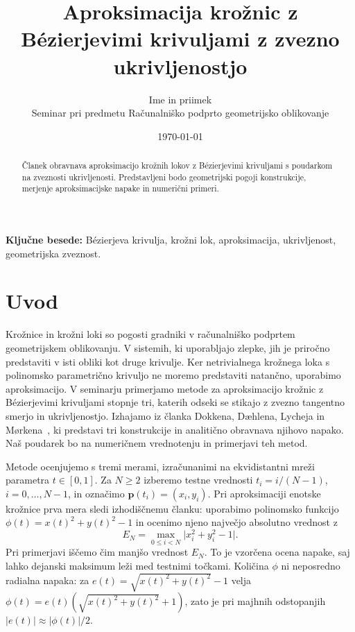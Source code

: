 \documentclass[a4paper,11pt]{article}
\title{Aproksimacija krožnic z Bézierjevimi krivuljami\break
       z zvezno ukrivljenostjo}
\author{Ime in priimek\\
  \small Seminar pri predmetu Računalniško podprto geometrijsko oblikovanje}
\date{\today}
\theoremstyle{definition}
\theoremstyle{remark}
\begin{document}
\maketitle

\begin{abstract}
Članek obravnava aproksimacijo krožnih lokov z Bézierjevimi krivuljami
s poudarkom na zveznosti ukrivljenosti. Predstavljeni bodo geometrijski
pogoji konstrukcije, merjenje aproksimacijske napake in numerični primeri.
\end{abstract}

\noindent\textbf{Ključne besede:} Bézierjeva krivulja, krožni lok,
aproksimacija, ukrivljenost, geometrijska zveznost.

\section{Uvod}
\label{sec:uvod}
Krožnice in krožni loki so pogosti gradniki v računalniško podprtem
geometrijskem oblikovanju. V sistemih, ki uporabljajo zlepke, jih je
priročno predstaviti v isti obliki kot druge krivulje. Ker netrivialnega
krožnega loka s polinomsko parametrično krivuljo ne moremo predstaviti
natančno, uporabimo aproksimacijo. V seminarju primerjamo metode za
aproksimacijo krožnic z Bézierjevimi krivuljami stopnje tri, katerih
odseki se stikajo z zvezno tangentno smerjo in ukrivljenostjo. Izhajamo
iz članka Dokkena, Dæhlena, Lycheja in Mørkena~\cite{dokken1990},
ki predstavi tri konstrukcije in analitično obravnava njihovo napako.
Naš poudarek bo na numeričnem vrednotenju in primerjavi teh metod.

Metode ocenjujemo s tremi merami, izračunanimi na ekvidistantni mreži
parametra $t\in[0,1]$. Za $N\geq 2$ izberemo testne vrednosti
$t_i=i/(N-1)$, $i=0,\ldots,N-1$, in označimo
$\mathbf{p}(t_i)=(x_i,y_i)$. Pri aproksimaciji enotske krožnice
prva mera sledi izhodiščnemu članku: uporabimo polinomsko funkcijo
$\phi(t)=x(t)^2+y(t)^2-1$ in ocenimo njeno največjo absolutno vrednost z
\begin{equation}
  E_N=\max_{0\leq i<N}\bigl|x_i^2+y_i^2-1\bigr|.
  \label{eq:uvod-napaka}
\end{equation}
Pri primerjavi iščemo čim manjšo vrednost $E_N$. To je vzorčena ocena
napake, saj lahko dejanski maksimum leži med testnimi točkami.
Količina $\phi$ ni neposredno radialna napaka: za
$e(t)=\sqrt{x(t)^2+y(t)^2}-1$ velja
$\phi(t)=e(t)(\sqrt{x(t)^2+y(t)^2}+1)$, zato je pri majhnih odstopanjih
$|e(t)|\approx|\phi(t)|/2$.
\end{document}
